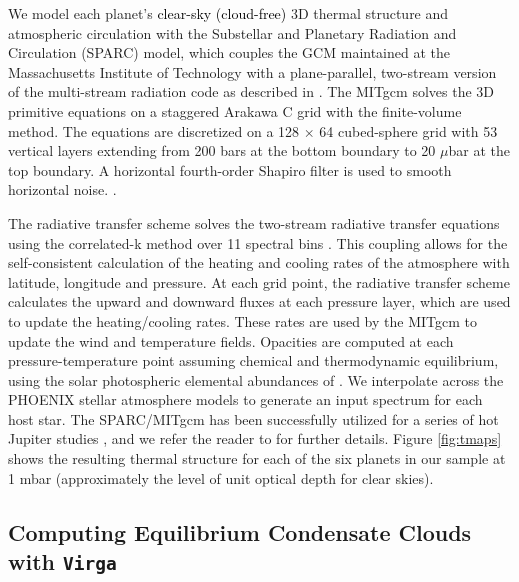 \documentclass[twocolumn]{aastex63}
\begin{document}
We model each planet’s \textcolor{black}{clear-sky (cloud-free)} 3D thermal structure and atmospheric circulation with the Substellar and Planetary Radiation and Circulation (SPARC) model, which couples the GCM maintained at the Massachusetts Institute of Technology \citep[the MITgcm;][]{adcroft2004} with a plane-parallel, two-stream version of the multi-stream radiation code as described in \citet{marley1999}. The MITgcm solves the 3D primitive equations on a staggered Arakawa C grid \citep{arakawa1977} with the finite-volume method. The equations are discretized on a 128 $\times$ 64 cubed-sphere grid with 53 vertical layers extending from 200 bars at the bottom boundary to 20 $\mu$bar at the top boundary. A horizontal fourth-order Shapiro filter is used to smooth horizontal noise. \color{black}{We let each model run for a simulated 1000+ Earth days so as to reach quasi-steady state equilibrium}. 

\color{black}The radiative transfer scheme solves the two-stream radiative transfer equations using the correlated-k method \citep[][]{goody1989,marley1999} over 11 spectral bins \citep[][]{kataria2013}. This coupling allows for the self-consistent calculation of the heating and cooling rates of the atmosphere with latitude, longitude and pressure. At each grid point, the radiative transfer scheme calculates the upward and downward fluxes at each pressure layer, which are used to update the heating/cooling rates. These rates are used by the MITgcm to update the wind and temperature fields. Opacities are computed at each pressure-temperature point assuming chemical and thermodynamic equilibrium, using the solar photospheric elemental abundances of \citet{lodders03}. We interpolate across the PHOENIX stellar atmosphere models to generate an input spectrum for each host star. The SPARC/MITgcm has been successfully utilized for a series of hot Jupiter studies \citep[e.g.][]{showman2009,showman2013,showman2015,kataria2013,kataria2015,kataria2016,parmentier2013,lewis2014}, and we refer the reader to \citet{kataria2016} for further details. Figure \ref{fig:tmaps} shows the resulting thermal structure for each of the six planets in our sample at 1 mbar (approximately the level of unit optical depth for clear skies).  

\subsection{Computing Equilibrium Condensate Clouds with \texttt{Virga}}\label{sec:virga}
\end{document}
